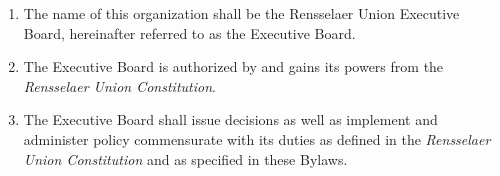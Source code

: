\begin{enumerate}

    \item The name of this organization shall be the Rensselaer Union Executive Board, hereinafter referred to as the Executive Board.
    \item The Executive Board is authorized by and gains its powers from the \textit{Rensselaer Union Constitution}.
    \item The Executive Board shall issue decisions as well as implement and administer policy commensurate with its duties as defined in the \textit{Rensselaer Union Constitution} and as specified in these Bylaws.

\end{enumerate}
